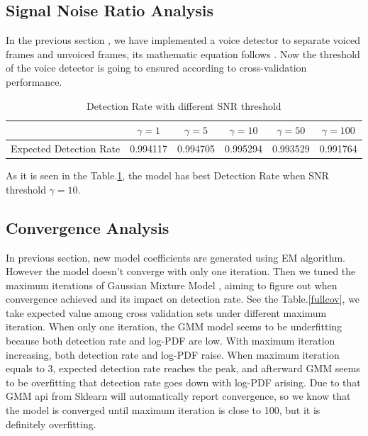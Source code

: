 \documentclass[12pt,DIV14,BCOR12mm,a4paper,footinclude=false,headinclude,parskip=half-,twoside,openright,cleardoublepage=empty,toc=index,bibliography=totoc,listof=totoc]{scrreprt}
\numberwithin{equation}{chapter}
\begin{document}
\subsection{Signal Noise Ratio Analysis}
In the previous section , we have implemented a voice detector to separate voiced frames and unvoiced frames, its mathematic equation follows . Now the threshold of the voice detector is going to ensured according to cross-validation performance. 

\begin{table}
    \centering
    \caption{Detection Rate with different SNR threshold}
    \label{SNR}
    \begin{tabular}{lccccc}
        \toprule
         & $\gamma=1$ & $\gamma=5 $& $\gamma=10 $& $\gamma=50$ & $\gamma=100 $\\
        \midrule
        Expected Detection Rate & 0.994117 & 0.994705 &  0.995294 & 0.993529 & 0.991764\\
        \bottomrule
    \end{tabular}
\end{table}

As it is seen in the Table.\ref{SNR}, the model has best Detection Rate when SNR threshold $\gamma = 10$.

\subsection{Convergence Analysis}
In previous section, new model coefficients are generated using EM algorithm. However the model doesn't converge with only one iteration. Then we tuned the maximum iterations of Gaussian Mixture Model , aiming to figure out when convergence achieved and its impact on detection rate. See the Table.\ref{fullcov}, we take expected value among cross validation sets under different maximum iteration. When only one iteration, the GMM model seems to be underfitting because both detection rate and log-PDF are low. With maximum iteration increasing, both detection rate and log-PDF raise. When maximum iteration equals to 3, expected detection rate reaches the peak, and afterward GMM seems to be overfitting that detection rate goes down with log-PDF arising. Due to that GMM api from Sklearn will automatically report convergence, so we know that the model is converged until maximum iteration is close to 100, but it is definitely overfitting.
\end{document}
